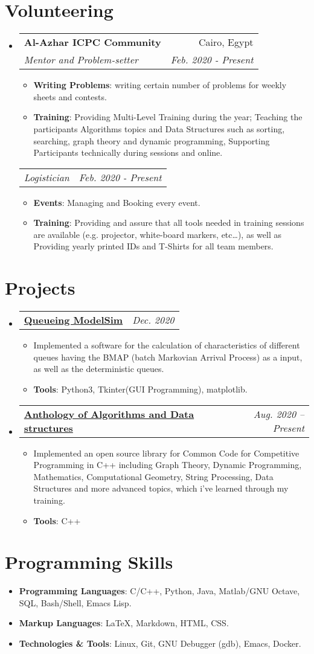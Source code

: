 \documentclass[letterpaper, 11pt]{article}
\makeatletter
\newcommand{\Item}[2]{\item\small{\textbf{#1}{#2 \vspace{-2pt}}}}
\newcommand{\SubSecListBeg}{\begin{itemize}[leftmargin=*]}
\newcommand{\SubSecListEnd}{\end{itemize}}
\newcommand{\ItemListBeg}{\begin{itemize}}
\newcommand{\ItemListEnd}{\end{itemize}\vspace{-5pt}}
\newcommand{\subsecfourtwoitalic}[4] {
	\vspace{-1pt}\item
	\begin{tabular*}{0.97\textwidth}[t]{l@{\extracolsep{\fill}}r}
		\textbf{#1} & #2 \\
		\textit{\small#3} & \textit{\small #4} \\
	\end{tabular*}\vspace{-5pt}
}
\newcommand{\subsubsectwoitalic}[2] {
	\begin{tabular*}{0.97\textwidth}{l@{\extracolsep{\fill}}r}
		\textit{\small#1} & \textit{\small #2} \\
	\end{tabular*}\vspace{-5pt}
}
\newcommand{\subsectwooneitalic}[2] {
	\vspace{-1pt}\item
	\begin{tabular*}{0.97\textwidth}[t]{l@{\extracolsep{\fill}}r}
		\textbf{#1} & \textit{\small #2} \\
	\end{tabular*}\vspace{-5pt}
}
\makeatother
\begin{document}
\section{Volunteering}
\SubSecListBeg
	\subsecfourtwoitalic
	{Al-Azhar ICPC Community}{Cairo, Egypt}
	{Mentor and Problem-setter}{Feb. 2020 - Present}
      	\ItemListBeg
        	\Item{Writing Problems}
        	{: writing certain number of problems for weekly sheets and contests.}
		\Item{Training}
		{: Providing Multi-Level Training during the year; Teaching the participants Algorithms topics and Data Structures such as sorting, searching, graph theory and dynamic programming, Supporting Participants technically during sessions and online.}
      	\ItemListEnd
	\subsubsectwoitalic
	{Logistician}{Feb. 2020 - Present}
	\ItemListBeg
        	\Item{Events}
        	{: Managing and Booking every event.}
        	\Item{Training}
          	{: Providing and assure that all tools needed in training sessions are available (e.g. projector, white-board markers, etc…), as well as Providing yearly printed IDs and T-Shirts for all team members.}
      	\ItemListEnd
\SubSecListEnd


\section{Projects}
\SubSecListBeg
	\subsectwooneitalic
	{\faIcon{user-clock} \href{https://github.com/AbdeltwabMF/Queueing-ModelSim}{Queueing ModelSim}}{Dec. 2020}
	\ItemListBeg
		\Item{}{Implemented a software for the calculation of characteristics of different queues having the BMAP (batch Markovian Arrival Process) as a input, as well as the deterministic queues.}
		\Item{Tools}
		{: Python3, Tkinter(GUI Programming), matplotlib.}
	\ItemListEnd

	\subsectwooneitalic
	{\faIcon{laptop-code} \href{https://github.com/AbdeltwabMF/Anthology-of-Algorithms-and-Data-structures}{Anthology of Algorithms and Data structures}}{Aug. 2020 -- Present}
	\ItemListBeg
		\Item{}{Implemented an open source library for Common Code for Competitive Programming in C++ including Graph Theory, Dynamic Programming, Mathematics, Computational Geometry, String Processing, Data Structures and more advanced topics, which i've learned through my training.}
		\Item{Tools}
		{: C++}
	\ItemListEnd
\SubSecListEnd

\section{Programming Skills}
\SubSecListBeg
	\Item{Programming Languages}{: C/C++, Python, Java, Matlab/GNU Octave, SQL, Bash/Shell, Emacs Lisp.}
	\Item{Markup Languages}{: \LaTeX, Markdown, HTML, CSS.}
	\Item{Technologies \& Tools}{: Linux, Git, GNU Debugger (gdb), Emacs, Docker.}
\SubSecListEnd
\end{document}
